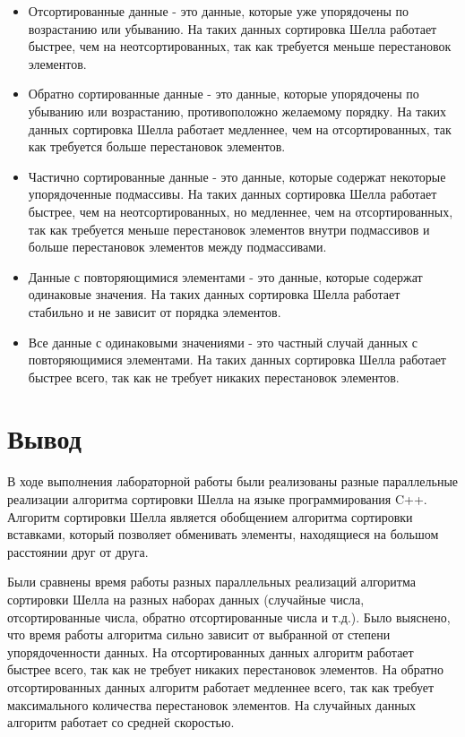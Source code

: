 \documentclass{article}
\begin{document}
\begin{itemize} \item Отсортированные данные - это данные, которые уже упорядочены по возрастанию или убыванию. На таких данных сортировка Шелла работает быстрее, чем на неотсортированных, так как требуется меньше перестановок элементов. \item Обратно сортированные данные - это данные, которые упорядочены по убыванию или возрастанию, противоположно желаемому порядку. На таких данных сортировка Шелла работает медленнее, чем на отсортированных, так как требуется больше перестановок элементов. \item Частично сортированные данные - это данные, которые содержат некоторые упорядоченные подмассивы. На таких данных сортировка Шелла работает быстрее, чем на неотсортированных, но медленнее, чем на отсортированных, так как требуется меньше перестановок элементов внутри подмассивов и больше перестановок элементов между подмассивами. \item Данные с повторяющимися элементами - это данные, которые содержат одинаковые значения. На таких данных сортировка Шелла работает стабильно и не зависит от порядка элементов. \item Все данные с одинаковыми значениями - это частный случай данных с повторяющимися элементами. На таких данных сортировка Шелла работает быстрее всего, так как не требует никаких перестановок элементов.\end{itemize} 

\newpage
\section{Вывод}
В ходе выполнения лабораторной работы были реализованы разные параллельные реализации алгоритма сортировки Шелла на языке программирования C++. Алгоритм сортировки Шелла является обобщением алгоритма сортировки вставками, который позволяет обменивать элементы, находящиеся на большом расстоянии друг от друга.

Были сравнены время работы разных параллельных реализаций алгоритма сортировки Шелла на разных наборах данных (случайные числа, отсортированные числа, обратно отсортированные числа и т.д.). Было выяснено, что время работы алгоритма сильно зависит от выбранной от степени упорядоченности данных. На отсортированных данных алгоритм работает быстрее всего, так как не требует никаких перестановок элементов. На обратно отсортированных данных алгоритм работает медленнее всего, так как требует максимального количества перестановок элементов. На случайных данных алгоритм работает со средней скоростью.
\end{document}
